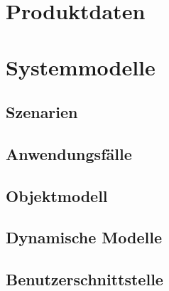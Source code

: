 \documentclass[a4paper]{scrreprt}
\begin{document}
\chapter{Produktdaten}

\chapter{Systemmodelle}
\section{Szenarien}
\section{Anwendungsfälle}
\section{Objektmodell}
\section{Dynamische Modelle}
\section{Benutzerschnittstelle}
\clearpage
\printglossary 
\end{document}
